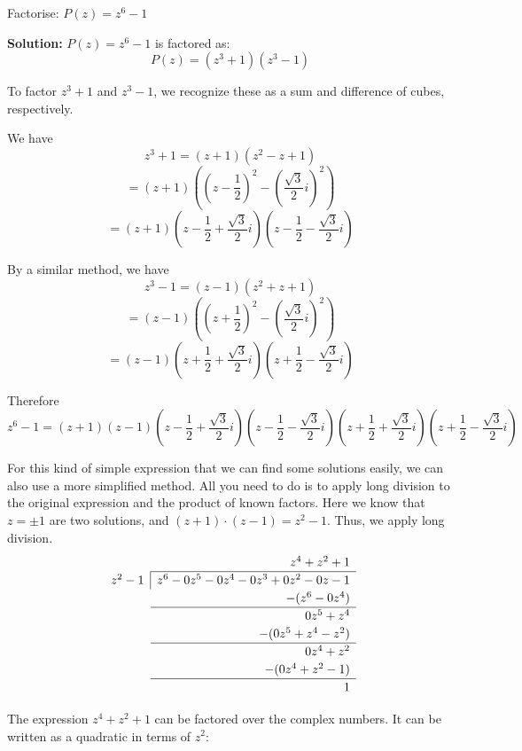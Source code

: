 \begin{example}
    Factorise: \( P(z) = z^6 - 1 \)
\end{example}
\textbf{Solution:}
\( P(z) = z^6 - 1 \) is factored as:
\[ P(z) = (z^3 + 1)(z^3 - 1) \]

To factor \( z^3 + 1 \) and \( z^3 - 1 \), we recognize these as a sum and difference of cubes, respectively.

We have
\[ z^3 + 1 = (z + 1)\left(z^2 - z + 1\right) \]
\[ = (z + 1)\left(\left(z - \frac{1}{2}\right)^2 - \left(\frac{\sqrt{3}}{2}i\right)^2\right) \]
\[ = (z + 1)\left(z - \frac{1}{2} + \frac{\sqrt{3}}{2}i\right)\left(z - \frac{1}{2} - \frac{\sqrt{3}}{2}i\right) \]

By a similar method, we have
\[ z^3 - 1 = (z - 1)\left(z^2 + z + 1\right) \]
\[ = (z - 1)\left(\left(z + \frac{1}{2}\right)^2 - \left(\frac{\sqrt{3}}{2}i\right)^2\right) \]
\[ = (z - 1)\left(z + \frac{1}{2} + \frac{\sqrt{3}}{2}i\right)\left(z + \frac{1}{2} - \frac{\sqrt{3}}{2}i\right) \]

Therefore
\[ z^6 - 1 = (z + 1)(z - 1)\left(z - \frac{1}{2} + \frac{\sqrt{3}}{2}i\right)\left(z - \frac{1}{2} - \frac{\sqrt{3}}{2}i\right)\left(z + \frac{1}{2} + \frac{\sqrt{3}}{2}i\right)\left(z + \frac{1}{2} - \frac{\sqrt{3}}{2}i\right) \]

For this kind of simple expression that we can find some solutions easily, we can also use a more
    simplified method. All you need to do is to apply long division to the original expression and the product
    of known factors. Here we know that $z=\pm1$ are two solutions, and $(z+1)\cdot(z-1) = z^2 - 1$. Thus, we apply long division.
    \[
\renewcommand\arraystretch{1.2}
\begin{array}{r|l}
\multicolumn{2}{r}{z^4 + z^2 + 1} \\
\cline{2-2}
z^2 - 1 & z^6 - 0z^5 - 0z^4 - 0z^3 + 0z^2 - 0z - 1 \\
\multicolumn{2}{r}{- (z^6 - 0z^4)} \\
\cline{2-2}
\multicolumn{2}{r}{0z^5 + z^4} \\
\multicolumn{2}{r}{- (0z^5 + z^4 - z^2)} \\
\cline{2-2}
\multicolumn{2}{r}{0z^4 + z^2} \\
\multicolumn{2}{r}{- (0z^4 + z^2 - 1)} \\
\cline{2-2}
\multicolumn{2}{r}{1} \\
\end{array}
\]

The expression \( z^4 + z^2 + 1 \) can be factored over the complex numbers. It can be written as a quadratic in terms of \( z^2 \):

